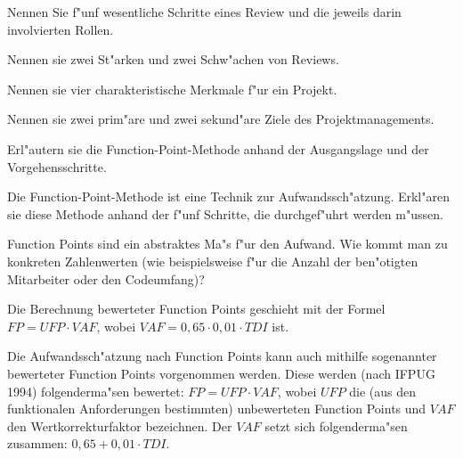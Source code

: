 \documentclass[12pt]{exam}
\begin{document}
\begin{questions}
\question[5] Nennen Sie f"unf wesentliche Schritte eines Review und die jeweils darin involvierten Rollen.
\addpoints

\question[4] Nennen sie zwei St"arken und zwei Schw"achen von Reviews.
\addpoints

\question[2] Nennen sie vier charakteristische Merkmale f"ur ein Projekt.
\addpoints

\question[4] Nennen sie zwei prim"are und zwei sekund"are Ziele des Projektmanagements.
\addpoints

\question[6] Erl"autern sie die Function-Point-Methode anhand der Ausgangslage und der Vorgehensschritte.
\addpoints

\question[5] Die Function-Point-Methode ist eine Technik zur Aufwandssch"atzung. Erkl"aren sie diese Methode anhand der f"unf Schritte, die durchgef"uhrt werden m"ussen.
\addpoints

\question[2] Function Points sind ein abstraktes Ma"s f"ur den Aufwand. Wie kommt man zu konkreten Zahlenwerten (wie beispielsweise f"ur die Anzahl der ben"otigten Mitarbeiter oder den Codeumfang)?
\addpoints

\question[6] Die Berechnung bewerteter Function Points geschieht mit der Formel $FP = UFP \cdot VAF$, wobei $VAF = 0,65 \cdot 0,01 \cdot TDI$ ist.
\noaddpoints
{}
\addpoints

\question[4] Die Aufwandssch"atzung nach Function Points kann auch mithilfe sogenannter bewerteter Function Points vorgenommen werden. Diese werden (nach IFPUG 1994) folgenderma"sen bewertet: $FP = UFP \cdot VAF$, wobei $UFP$ die (aus den funktionalen Anforderungen bestimmten) unbewerteten Function Points und $VAF$ den Wertkorrekturfaktor bezeichnen. Der $VAF$ setzt sich folgenderma"sen zusammen: $0,65 + 0,01 \cdot TDI$.
\noaddpoints
{}
\end{questions}
\end{document}
